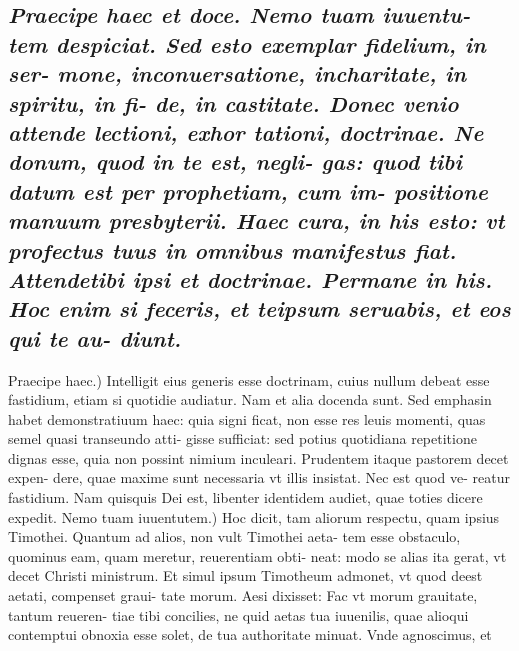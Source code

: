 \documentclass{article}
\begin{document}
\begin{pages}
\subsection*{\textit{Praecipe haec et doce. Nemo tuam iuuentu- tem despiciat. Sed esto exemplar fidelium, in ser- mone, inconuersatione, incharitate, in spiritu, in fi- de, in castitate. Donec venio attende lectioni, exhor tationi, doctrinae. Ne donum, quod in te est, negli- gas: quod tibi datum est per prophetiam, cum im- positione manuum presbyterii. Haec cura, in his esto: vt profectus tuus in omnibus manifestus fiat. Attendetibi ipsi et doctrinae. Permane in his. Hoc enim si feceris, et teipsum seruabis, et eos qui te au- diunt. }}\pstart Praecipe haec.) Intelligit eius generis esse doctrinam, cuius nullum debeat esse fastidium, etiam si quotidie audiatur. Nam et alia docenda sunt. Sed emphasin habet demonstratiuum haec: quia signi ficat, non esse res leuis momenti, quas semel quasi transeundo atti- gisse sufficiat: sed potius quotidiana repetitione dignas esse, quia non possint nimium inculeari. Prudentem itaque pastorem decet expen- dere, quae maxime sunt necessaria vt illis insistat. Nec est quod ve- reatur fastidium. Nam quisquis Dei est, libenter identidem audiet, quae toties dicere expedit.  \pend\pstart Nemo tuam iuuentutem.) Hoc dicit, tam aliorum respectu, quam ipsius Timothei. Quantum ad alios, non vult Timothei aeta- tem esse obstaculo, quominus eam, quam meretur, reuerentiam obti- neat: modo se alias ita gerat, vt decet Christi ministrum. Et simul ipsum Timotheum admonet, vt quod deest aetati, compenset graui- tate morum. Aesi dixisset: Fac vt morum grauitate, tantum reueren- tiae tibi concilies, ne quid aetas tua iuuenilis, quae alioqui contemptui obnoxia esse solet, de tua authoritate minuat. Vnde agnoscimus, et  \pend

\end{pages}
\end{document}
